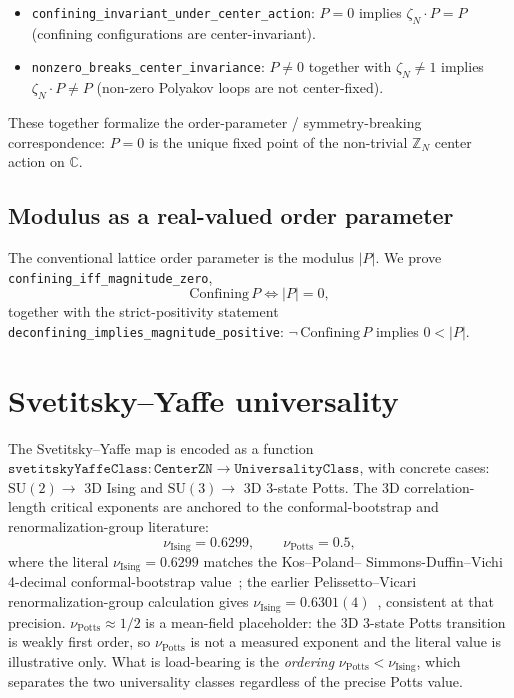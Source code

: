 \documentclass[twocolumn]{revtex4-2}
\newcommand{\Polyakov}{P}
\newcommand{\nuIsing}{\nu_{\mathrm{Ising}}}
\newcommand{\nuPotts}{\nu_{\mathrm{Potts}}}
\begin{document}
\begin{itemize}
\item \texttt{confining\_invariant\_under\_center\_action}:
$\Polyakov = 0$ implies $\zeta_N \cdot \Polyakov = \Polyakov$
(confining configurations are center-invariant).
\item \texttt{nonzero\_breaks\_center\_invariance}:
$\Polyakov \neq 0$ together with $\zeta_N \neq 1$ implies
$\zeta_N \cdot \Polyakov \neq \Polyakov$ (non-zero Polyakov loops are
not center-fixed).
\end{itemize}

These together formalize the order-parameter / symmetry-breaking
correspondence: $\Polyakov = 0$ is the unique fixed point of the
non-trivial $\mathbb{Z}_N$ center action on $\mathbb{C}$.

\subsection{Modulus as a real-valued order parameter}

The conventional lattice order parameter is the modulus $|\Polyakov|$.
We prove
\texttt{confining\_iff\_magnitude\_zero},
\begin{equation}
\mathrm{Confining}\,\Polyakov \iff |\Polyakov| = 0,
\end{equation}
together with the strict-positivity statement
\texttt{deconfining\_implies\_magnitude\_positive}:
$\neg\,\mathrm{Confining}\,\Polyakov$ implies $0 < |\Polyakov|$.

\section{Svetitsky--Yaffe universality}
\label{sec:svetitsky-yaffe}

The Svetitsky--Yaffe map is encoded as a function
$\texttt{svetitskyYaffeClass}: \texttt{CenterZN} \to
\texttt{UniversalityClass}$, with concrete cases:
$\mathrm{SU}(2) \to$ 3D Ising and $\mathrm{SU}(3) \to$ 3D 3-state
Potts. The 3D correlation-length critical exponents are anchored to
the conformal-bootstrap and renormalization-group literature:
\begin{equation}
\nuIsing = 0.6299, \qquad \nuPotts = 0.5,
\label{eq:nu}
\end{equation}
where the literal $\nuIsing = 0.6299$ matches the Kos--Poland--
Simmons-Duffin--Vichi 4-decimal conformal-bootstrap
value~\cite{KosPolandSimmonsDuffin2016}; the earlier
Pelissetto--Vicari renormalization-group calculation gives
$\nuIsing = 0.6301(4)$~\cite{PelissettoVicari2002}, consistent at
that precision. $\nuPotts \approx 1/2$ is a
mean-field placeholder: the 3D 3-state Potts transition is
weakly first order, so $\nuPotts$ is not a measured exponent and the
literal value is illustrative only. What is load-bearing is the
\emph{ordering} $\nuPotts < \nuIsing$, which separates the two
universality classes regardless of the precise Potts value.
\end{document}
